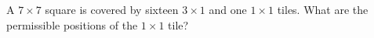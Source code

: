 A $7 \times 7$ square is covered by sixteen $3 \times 1$ and one $1 \times 1$ tiles. What are the permissible positions of the $1 \times 1$ tile?
